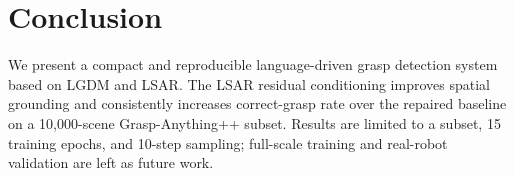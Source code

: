 \section{Conclusion}
We present a compact and reproducible language-driven grasp detection system
based on LGDM and LSAR.  The LSAR residual conditioning improves spatial
grounding and consistently increases correct-grasp rate over the repaired
baseline on a 10{,}000-scene Grasp-Anything++ subset.  Results are limited to
a subset, 15 training epochs, and 10-step sampling; full-scale training and
real-robot validation are left as future work.
